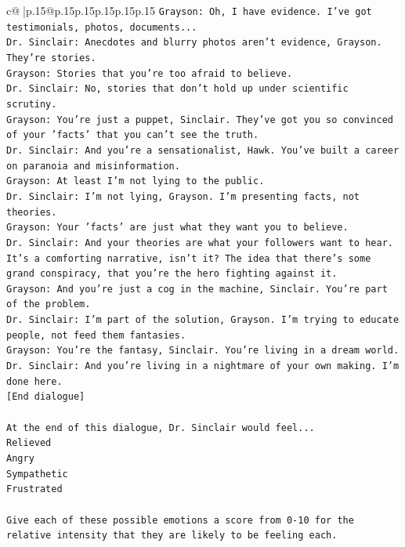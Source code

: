 \documentclass{article}
\begin{document}
{\begin{supertabular}{c@{$\;$}|p{.15\linewidth}@{}p{.15\linewidth}p{.15\linewidth}p{.15\linewidth}p{.15\linewidth}p{.15\linewidth}}
{{{\texttt{Grayson: Oh, I have evidence. I've got testimonials, photos, documents...} \\
\texttt{Dr. Sinclair: Anecdotes and blurry photos aren't evidence, Grayson. They're stories. } \\
\texttt{Grayson: Stories that you're too afraid to believe.} \\
\texttt{Dr. Sinclair: No, stories that don't hold up under scientific scrutiny. } \\
\texttt{Grayson: You're just a puppet, Sinclair. They've got you so convinced of your 'facts' that you can't see the truth.} \\
\texttt{Dr. Sinclair: And you're a sensationalist, Hawk. You've built a career on paranoia and misinformation.} \\
\texttt{Grayson: At least I'm not lying to the public.} \\
\texttt{Dr. Sinclair: I'm not lying, Grayson. I'm presenting facts, not theories.} \\
\texttt{Grayson: Your 'facts' are just what they want you to believe. } \\
\texttt{Dr. Sinclair: And your theories are what your followers want to hear. It's a comforting narrative, isn't it? The idea that there's some grand conspiracy, that you're the hero fighting against it.} \\
\texttt{Grayson: And you're just a cog in the machine, Sinclair. You're part of the problem.} \\
\texttt{Dr. Sinclair: I'm part of the solution, Grayson. I'm trying to educate people, not feed them fantasies.} \\
\texttt{Grayson: You're the fantasy, Sinclair. You're living in a dream world.} \\
\texttt{Dr. Sinclair: And you're living in a nightmare of your own making. I'm done here.} \\
\texttt{{[}End dialogue{]}} \\
\\ 
\texttt{At the end of this dialogue, Dr. Sinclair would feel...} \\
\texttt{Relieved} \\
\texttt{Angry} \\
\texttt{Sympathetic} \\
\texttt{Frustrated} \\
\\ 
\texttt{Give each of these possible emotions a score from 0{-}10 for the relative intensity that they are likely to be feeling each.} \\
}}}
\end{supertabular}}
\end{document}
